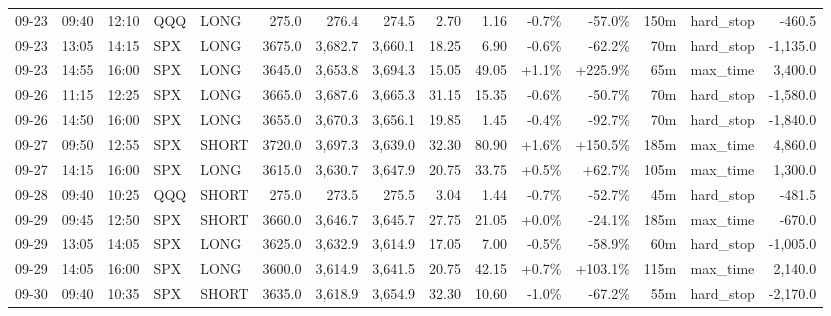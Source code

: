 \documentclass[11pt,a4paper,twoside]{article}
\begin{document}
\begin{landscape}
\begin{center}
\begin{longtable}{>{\color{txtmain}}l l l l l r r r r r r r r >{\color{txtmain}}l r}
09-23 & 09:40 & 12:10 & QQQ & LONG & 275.0 & 276.4 & 274.5 & 2.70 & 1.16 & \textcolor{lossred}{-0.7\%} & \textcolor{lossred}{-57.0\%} & 150m & hard\_stop & \textcolor{lossred}{-460.5} \\
09-23 & 13:05 & 14:15 & SPX & LONG & 3675.0 & 3,682.7 & 3,660.1 & 18.25 & 6.90 & \textcolor{lossred}{-0.6\%} & \textcolor{lossred}{-62.2\%} & 70m & hard\_stop & \textcolor{lossred}{-1,135.0} \\
09-23 & 14:55 & 16:00 & SPX & LONG & 3645.0 & 3,653.8 & 3,694.3 & 15.05 & 49.05 & \textcolor{wingreen}{+1.1\%} & \textcolor{wingreen}{+225.9\%} & 65m & max\_time & \textcolor{wingreen}{3,400.0} \\
09-26 & 11:15 & 12:25 & SPX & LONG & 3665.0 & 3,687.6 & 3,665.3 & 31.15 & 15.35 & \textcolor{lossred}{-0.6\%} & \textcolor{lossred}{-50.7\%} & 70m & hard\_stop & \textcolor{lossred}{-1,580.0} \\
09-26 & 14:50 & 16:00 & SPX & LONG & 3655.0 & 3,670.3 & 3,656.1 & 19.85 & 1.45 & \textcolor{lossred}{-0.4\%} & \textcolor{lossred}{-92.7\%} & 70m & hard\_stop & \textcolor{lossred}{-1,840.0} \\
09-27 & 09:50 & 12:55 & SPX & SHORT & 3720.0 & 3,697.3 & 3,639.0 & 32.30 & 80.90 & \textcolor{wingreen}{+1.6\%} & \textcolor{wingreen}{+150.5\%} & 185m & max\_time & \textcolor{wingreen}{4,860.0} \\
09-27 & 14:15 & 16:00 & SPX & LONG & 3615.0 & 3,630.7 & 3,647.9 & 20.75 & 33.75 & \textcolor{wingreen}{+0.5\%} & \textcolor{wingreen}{+62.7\%} & 105m & max\_time & \textcolor{wingreen}{1,300.0} \\
09-28 & 09:40 & 10:25 & QQQ & SHORT & 275.0 & 273.5 & 275.5 & 3.04 & 1.44 & \textcolor{lossred}{-0.7\%} & \textcolor{lossred}{-52.7\%} & 45m & hard\_stop & \textcolor{lossred}{-481.5} \\
09-29 & 09:45 & 12:50 & SPX & SHORT & 3660.0 & 3,646.7 & 3,645.7 & 27.75 & 21.05 & \textcolor{wingreen}{+0.0\%} & \textcolor{lossred}{-24.1\%} & 185m & max\_time & \textcolor{lossred}{-670.0} \\
09-29 & 13:05 & 14:05 & SPX & LONG & 3625.0 & 3,632.9 & 3,614.9 & 17.05 & 7.00 & \textcolor{lossred}{-0.5\%} & \textcolor{lossred}{-58.9\%} & 60m & hard\_stop & \textcolor{lossred}{-1,005.0} \\
09-29 & 14:05 & 16:00 & SPX & LONG & 3600.0 & 3,614.9 & 3,641.5 & 20.75 & 42.15 & \textcolor{wingreen}{+0.7\%} & \textcolor{wingreen}{+103.1\%} & 115m & max\_time & \textcolor{wingreen}{2,140.0} \\
09-30 & 09:40 & 10:35 & SPX & SHORT & 3635.0 & 3,618.9 & 3,654.9 & 32.30 & 10.60 & \textcolor{lossred}{-1.0\%} & \textcolor{lossred}{-67.2\%} & 55m & hard\_stop & \textcolor{lossred}{-2,170.0} \\

\end{longtable}
\end{center}
\end{landscape}
\end{document}
